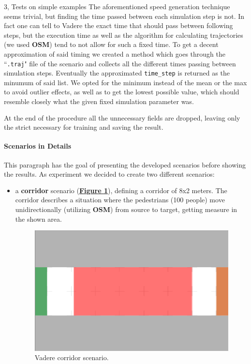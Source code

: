\documentclass[10pt,a4paper]{article}
\begin{document}
\begin{task}{3, Tests on simple examples}
The aforementioned speed generation technique seems trivial, but finding the time passed between each simulation step is not. In fact one can tell to Vadere the exact time that should pass between following steps, but the execution time as well as the algorithm for calculating trajectories (we used \textbf{OSM}) tend to not allow for such a fixed time. To get a decent approximation of said timing we created a method which goes through the ``\texttt{.traj}" file of the scenario and collects all the different times passing between simulation steps. Eventually the approximated \texttt{time\_step} is returned as the minumum of said list. We opted for the minimum instead of the mean or the max to avoid outlier effects, as well as to get the lowest possible value, which should resemble closely what the given fixed simulation parameter was.

At the end of the procedure all the unnecessary fields are dropped, leaving only the strict necessary for training and saving the result.

\paragraph{Scenarios in Details}
This paragraph has the goal of presenting the developed scenarios before showing the results.
As experiment we decided to create two different scenarios:
\begin{itemize}
    \item a \textbf{corridor} scenario (\textbf{\hyperref[fig:vadere-corridor]{Figure \ref{fig:vadere-corridor}}}), defining a corridor of 8x2 meters. The corridor describes a situation where the pedestrians (100 people) move unidirectionally (utilizing \textbf{OSM}) from source to target, getting measure in the shown area.
    
    \begin{figure}[h]
    \centering
    \includegraphics[scale=0.8]{images/vadere-corridor.png}
    \caption{Vadere corridor scenario.}
    \label{fig:vadere-corridor}
    \end{figure}


\end{itemize}
\end{task}
\end{document}
